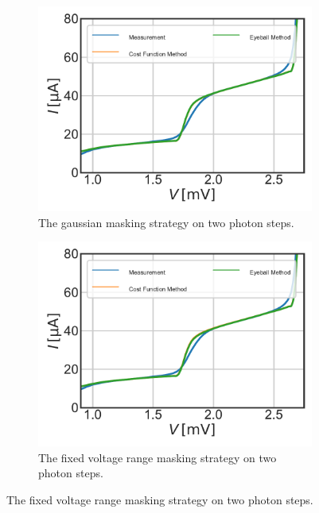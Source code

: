 \documentclass[]{article}
\begin{document}
\begin{figure}
	\centering              
	\begin{subfigure}[t]{0.49\textwidth}
		\centering
		\includegraphics[width=\linewidth]{./../Mixer_Unit_Test/2020_01_15_Gaus_Two_Steps/Pumped_Recovered_Comparison_Two_Photon_Steps.pdf}
		\caption{The gaussian masking strategy on two photon steps.}
	\end{subfigure}
	\begin{subfigure}[t]{0.49\textwidth}
		\centering
		\includegraphics[width=\linewidth]{./../Mixer_Unit_Test/2020_01_15_twoPhotonStepsFixed/Pumped_Recovered_Comparison_Two_Photon_Steps.pdf}
		\caption{The fixed voltage range masking strategy on two photon steps.}
	\end{subfigure}

\end{figure}
\end{document}
